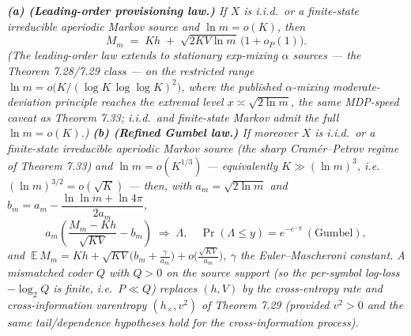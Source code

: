 \documentclass[
]{article}
\begin{document}
\emph{\textbf{(a) (Leading-order provisioning law.)} If $X$ is i.i.d.\ or a finite-state
irreducible aperiodic Markov source and $\ln m=o(K)$, then}
\[
  M_m\;=\;Kh\;+\;\sqrt{2KV\ln m}\,\bigl(1+o_P(1)\bigr).
\]
\emph{(The leading-order law extends to stationary exp-mixing $\alpha$ sources --- the
Theorem 7.28/7.29 class --- on the restricted range $\ln m=o\bigl(K/(\log K\,\log\log
K)^2\bigr)$, where the published $\alpha$-mixing moderate-deviation principle reaches the
extremal level $x\asymp\sqrt{2\ln m}$, the same MDP-speed caveat as Theorem 7.33; i.i.d.\ and
finite-state Markov admit the full $\ln m=o(K)$.)}
\emph{\textbf{(b) (Refined Gumbel law.)} If moreover $X$ is i.i.d.\ or a finite-state
irreducible aperiodic Markov source (the sharp Cram\'er--Petrov regime of Theorem 7.33) and
$\ln m=o(K^{1/3})$ --- equivalently $K\gg(\ln m)^3$, i.e.\ $(\ln m)^{3/2}=o(\sqrt K)$ ---
then, with $a_m=\sqrt{2\ln m}$ and $b_m=a_m-\dfrac{\ln\ln m+\ln4\pi}{2a_m}$,}
\[
  a_m\!\left(\frac{M_m-Kh}{\sqrt{KV}}-b_m\right)\;\Longrightarrow\;\Lambda,\quad
  \Pr(\Lambda\le y)=e^{-e^{-y}}\ (\text{Gumbel}),
\]
\emph{and $\ \mathbb E\,M_m=Kh+\sqrt{KV}\bigl(b_m+\tfrac{\gamma}{a_m}\bigr)
+o\!\bigl(\tfrac{\sqrt{KV}}{a_m}\bigr)$, $\gamma$ the Euler--Mascheroni constant. A
mismatched coder $Q$ with $Q>0$ on the source support (so the per-symbol log-loss
$-\log_2 Q$ is finite, i.e.\ $P\ll Q$) replaces $(h,V)$ by the cross-entropy rate and
cross-information varentropy $(h_\times,v^2)$ of Theorem 7.29 (provided $v^2>0$ and the same
tail/dependence hypotheses hold for the cross-information process).}
\end{document}
